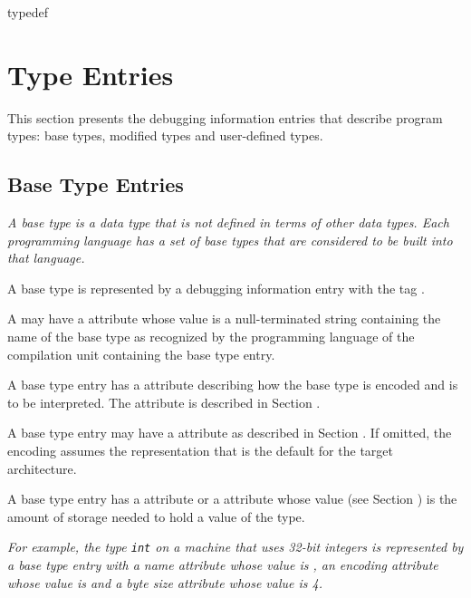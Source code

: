 {typedef\chapter{Type Entries}
\label{chap:typeentries}
This section presents the debugging information entries
that describe program types: base types, modified types and
user-defined types.


\section{Base Type Entries}
\label{chap:basetypeentries}

\textit{A base type is a data type that is not defined in terms of
other data types. 
Each programming language has a set of base
types that are considered to be built into that language.}

A base type is represented by a debugging information entry
with the tag \DWTAGbasetypeTARG.

A 
may have a \DWATname{} attribute
whose value is
a null-terminated string containing the name of the base type
as recognized by the programming language of the compilation
unit containing the base type entry.

A base type entry has 
a \DWATencoding{} attribute describing
how the base type is encoded and is to be interpreted. 
The \DWATencoding{} attribute is described in
Section .

A base type entry
may have a \DWATendianity{} attribute
as described in 
Section . 
If omitted, the encoding assumes the representation that
is the default for the target architecture.

A base type entry has a
\DWATbytesize{}\hypertarget{chap:DWATbytesizedataobjectordatatypesize}{}
attribute or a
\DWATbitsize{}\hypertarget{chap:DWATbitsizebasetypebitsize}{} 
attribute whose  value
(see Section ) 
is the amount of storage needed to hold a value of the type.

\textit{For example, the 
 type \texttt{int} on a machine that uses 32-bit
integers is represented by a base type entry with a name
attribute whose value is , an encoding attribute
whose value is \DWATEsigned{}
and a byte size attribute whose value is 4.}

}
